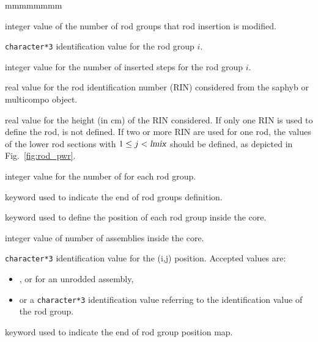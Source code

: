 \begin{ListeDeDescription}{mmmmmmmm}
\item[\dusa{nrmv}] integer value of the number of rod groups that rod insertion is modified.

\item[\dusa{hgrp}] \texttt{character*3} identification value for the rod group $i$.

\item[\dusa{isrt}] integer value for the number of inserted steps for the rod group $i$.

\item[\dusa{rin}] real value for the rod identification number (RIN) considered from the {\sc saphyb} or {\sc multicompo} object.

\item[\dusa{hmix}] real value for the height (in cm) of the RIN considered.
If only one RIN is used to define the rod,  is not defined. If two or more RIN are used for one rod, 
the values of the lower rod sections with $1\le j < \dusa{lmix}$ should be defined, as depicted in Fig.~\ref{fig:rod_pwr}.

\item[\dusa{lmix}] integer value for the number of  for each rod group.

\item[\moc{ENDRGRP}] keyword used to indicate the end of rod groups definition.

\item[\moc{RMAP}] keyword used to define the position of each rod group inside the core.

\item[\dusa{nass}] integer value of number of assemblies inside the core.

\item[\dusa{hrod}] \texttt{character*3} identification value for the (i,j) position. Accepted
values are:
\begin{itemize}
\item \moc{|}, \moc{-} or \moc{-|-} for an unrodded assembly,
\item or a \texttt{character*3} identification value referring to the identification value of the rod group.
\end{itemize}

\item[\moc{ENDRMAP}] keyword used to indicate the end of rod group position map.

\end{ListeDeDescription}

\eject
